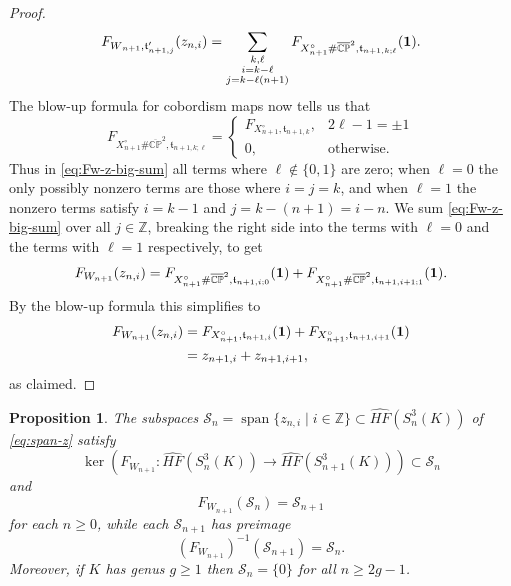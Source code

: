 \documentclass[11pt]{amsart}
\newtheorem {proposition}[theorem]{Proposition}
\numberwithin{equation}{section}
\numberwithin{theorem}{section}
\theoremstyle{definition}
\newcommand{\Z}{\mathbb{Z}}
\newcommand{\CP}{\mathbb{CP}}
\newcommand{\spint}{\mathfrak{t}}
\newcommand{\cS}{\mathcal{S}}
\newcommand{\cptwo}{\overline{\CP}^2}
\DeclareMathOperator{\Span}{span}
\newcommand{\hfhat}{\widehat{\mathit{HF}}}
\begin{document}
\begin{proof}
\begin{equation} \label{eq:Fw-z-big-sum}
F_{W\vphantom{'}_{n+1\vphantom{,j}},\spint'_{n+1,j}}(z_{n,i}) = \sum_{\substack{k,\ell \\ i = k-\ell \\ j = k-\ell(n+1) }} F_{X^\circ_{n+1} \# \cptwo, \spint_{n+1,k;\ell}}( {\bf 1} ).
\end{equation}
The blow-up formula for cobordism maps \cite[Theorem~3.7]{osz-triangles} now tells us that
\[ F_{X^\circ_{n+1}\#\cptwo, \spint_{n+1,k;\ell}} = \begin{cases} F_{X^\circ_{n+1},\spint_{n+1,k}}, & 2\ell-1=\pm1 \\ 0, & \text{otherwise}. \end{cases} \]
Thus in \eqref{eq:Fw-z-big-sum} all terms where $\ell \not\in \{0,1\}$ are zero; when $\ell=0$ the only possibly nonzero terms are those where $i=j=k$, and when $\ell=1$ the nonzero terms satisfy $i=k-1$ and $j=k-(n+1) = i - n$.  We sum \eqref{eq:Fw-z-big-sum} over all $j\in\Z$, breaking the right side into the terms with $\ell=0$ and the terms with $\ell=1$ respectively, to get
\[ F_{W_{n+1}}(z_{n,i}) = F_{X^\circ_{n+1} \# \cptwo, \spint_{n+1,i;0}}( {\bf 1} ) + F_{X^\circ_{n+1} \# \cptwo, \spint_{n+1,i+1;1}}( {\bf 1} ). \]
By the blow-up formula this simplifies to
\begin{align*}
F_{W_{n+1}}(z_{n,i}) &= F_{X^\circ_{n+1}, \spint_{n+1,i}}( {\bf 1} ) + F_{X^\circ_{n+1}, \spint_{n+1,i+1}}( {\bf 1} ) \\
&= z_{n+1,i} + z_{n+1,i+1},
\end{align*}
as claimed.
\end{proof}

\begin{proposition} \label{prop:fw-sn}
The subspaces $\cS_n = \Span\{z_{n,i} \mid i\in\Z\} \subset \hfhat(S^3_n(K))$ of \eqref{eq:span-z} satisfy
\[ \ker\left(F_{W_{n+1}}: \hfhat(S^3_n(K)) \to \hfhat(S^3_{n+1}(K)) \right) \subset \cS_n \]
and
\[ F_{W_{n+1}}(\cS_n) = \cS_{n+1} \]
for each $n \geq 0$, while each $\cS_{n+1}$ has preimage
\[ (F_{W_{n+1}})^{-1}(\cS_{n+1}) = \cS_n. \]
Moreover, if $K$ has genus $g \geq 1$ then $\cS_n = \{ 0 \}$ for all $n \geq 2g-1$.
\end{proposition}
\end{document}
